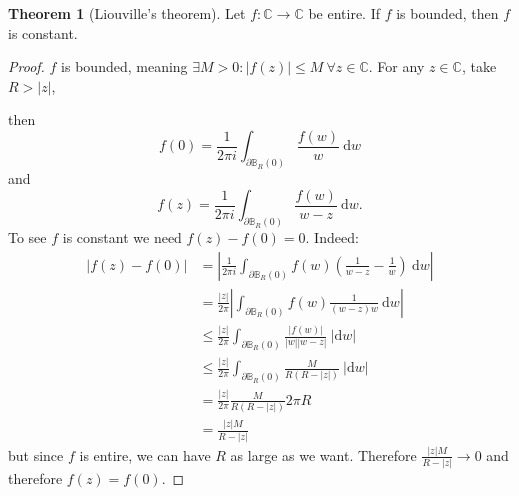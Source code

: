 \documentclass[a4paper]{article}
\theoremstyle{definition}
\newtheorem{thm}[defn]{Theorem}
\begin{document}
\begin{thm}[Liouville's theorem]
Let $f:\mathbb C\rightarrow \mathbb C$ be entire. If $f$ is bounded, then $f$ is constant.
\end{thm}
\begin{proof}
$f$ is bounded, meaning $\exists M>0:|f(z)|\leq M \ \forall z\in \mathbb C$. For any $z\in \mathbb C$, take $R>|z|$, 

\begin{center}
\end{center}
then
\[
f(0)=\frac{1}{2\pi i} \int_{\partial \mathbb B_R(0)} \frac{f(w)}{w} \ \mathrm d w
\]
and
\[
f(z)=\frac{1}{2\pi i} \int_{\partial \mathbb B_R(0)} \frac{f(w)}{w-z} \ \mathrm d w.
\]
To see $f$ is constant we need $f(z)-f(0)=0$. Indeed:
\[
\begin{aligned}
|f(z)-f(0)| &= \left|\frac{1}{2\pi i} \int_{\partial \mathbb B_R(0)} f(w) \left( \frac{1}{w-z}-\frac{1}{w}\right) \ \mathrm d w\right| \\
&= \frac{|z|}{2\pi} \left|\int_{\partial \mathbb B_R(0)} f(w) \frac{1}{(w-z)w} \ \mathrm d w \right| \\
&\leq \frac{|z|}{2\pi} \int_{\partial \mathbb B_R(0)} \frac{|f(w)|}{|w||w-z|} \ |\mathrm d w| \\
&\leq \frac{|z|}{2\pi} \int_{\partial \mathbb B_R(0)} \frac{M}{R(R-|z|)} \ |\mathrm d w| \\
&=\frac{|z|}{2\pi} \frac{M}{R(R-|z|)} 2\pi R \\
&= \frac{|z|M}{R-|z|}
\end{aligned}
\]
but since $f$ is entire, we can have $R$ as large as we want. Therefore $\frac{|z|M}{R-|z|}\rightarrow 0$ and therefore $f(z)=f(0)$.
\end{proof}
\end{document}
